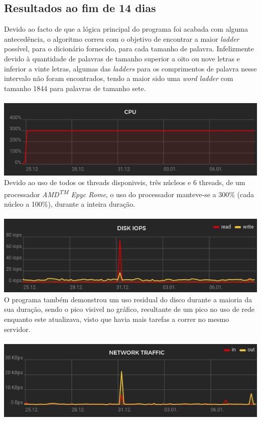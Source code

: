 \documentclass[a4paper,11pt]{article}
\begin{document}
	\subsection{Resultados ao fim de 14 dias}
	Devido ao facto de que a lógica principal do programa foi acabada com alguma antecedência, o algoritmo correu com o objetivo de encontrar a maior \emph{ladder} possível, para o dicionário fornecido, para cada tamanho de palavra.
	Infelizmente devido à quantidade de palavras de tamanho superior a oito ou nove letras e inferior a vinte letras, algumas das \emph{ladders} para os comprimentos de palavra nesse intervalo não foram encontrados, tendo a maior sido uma \emph{word ladder} com tamanho 1844 para palavras de tamanho sete.\\ \\
	 \includegraphics[width=\textwidth]{cpu}\label{fig:figure}\\
	Devido ao uso de todos os threads disponiveis, três núcleos e 6 threads, de um processador \emph{AMD\textsuperscript{TM} Epyc Rome}, o uso do processador manteve-se a 300\% (cada núcleo a 100\%), durante a inteira duração.\\ \\
	\includegraphics[width=\textwidth]{iops}\label{fig:figure}\\
	O programa também demonstrou um uso residual do disco durante a maioria da sua duração, sendo o pico visivel no gráfico, resultante de um pico no uso de rede enquanto este atualizava, visto que havia mais tarefas a correr no mesmo servidor.\\ \\     
	\includegraphics[width=\textwidth]{net}\label{fig:figure}\\     
    \clearpage
\end{document}

